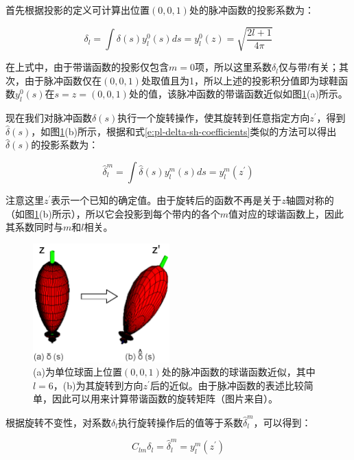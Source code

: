 首先根据投影的定义可计算出位置$(0,0,1)$处的脉冲函数的投影系数为：

\begin{equation}\label{e:pl-delta-sh-coefficients}
	\delta_l=\int\delta(s)y^{0}_{l}(s)ds=y^{0}_{l}(z)=\sqrt{\frac{2l+1}{4\pi}}
\end{equation}

在上式中，由于带谐函数的投影仅包含$m=0$项，所以这里系数$\delta_l$仅与带$l$有关；其次，由于脉冲函数仅在$(0,0,1)$处取值且为1，所以上述的投影积分值即为球鞋函数$y^{0}_l(s)$在$s=z=(0,0,1)$处的值，该脉冲函数的带谐函数近似如图\ref{f:pl-zonal-rotation}(a)所示。

现在我们对脉冲函数$\delta(s)$执行一个旋转操作，使其旋转到任意指定方向$z^{'}$，得到$\hat{\delta}(s)$，如图\ref{f:pl-zonal-rotation}(b)所示，根据和式\ref{e:pl-delta-sh-coefficients}类似的方法可以得出$\hat{\delta}(s)$的投影系数为：

\begin{equation}
	\hat{\delta}^{m}_l=\int\hat{\delta}(s)y^{m}_{l}(s)ds=y^{m}_{l}(z^{'})
\end{equation}

注意这里$z^{'}$表示一个已知的确定值。由于旋转后的函数不再是关于$z$轴圆对称的（如图\ref{f:pl-zonal-rotation}(b)所示），所以它会投影到每个带内的各个$m$值对应的球谐函数上，因此其系数同时与$m$和$l$相关。

\begin{figure}
	\sidecaption
	\includegraphics[width=0.47\textwidth]{figures/prt/zonal-rotation}
	\caption{(a)为单位球面上位置$(0,0,1)$处的脉冲函数的球谐函数近似，其中$l=6$，(b)为其旋转到方向$z^{'}$后的近似。由于脉冲函数的表述比较简单，因此可以用来计算带谐函数的旋转矩阵（图片来自\cite{a:LocalDeformablePrecomputedRadianceTransfer}）。}
	\label{f:pl-zonal-rotation}
\end{figure}

根据旋转不变性，对系数$\delta_l$执行旋转操作后的值等于系数$\hat{\delta}^{m}_l$，可以得到：

\begin{equation}
	C_{lm}\delta_l=\hat{\delta}^{m}_{l}=y^{m}_{l}(z^{'})
\end{equation}

